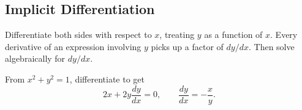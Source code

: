 \subsection*{Implicit Differentiation}

\begin{remark*}[Method]
Differentiate both sides with respect to \(x\), treating \(y\) as a function
of \(x\). Every derivative of an expression involving \(y\) picks up a factor
of \(dy/dx\). Then solve algebraically for \(dy/dx\).
\end{remark*}

\begin{example*}[Circle]
From \(x^2+y^2=1\), differentiate to get
\[
  2x+2y\frac{dy}{dx}=0,
  \qquad
  \frac{dy}{dx}=-\frac{x}{y}.
\]
\end{example*}
